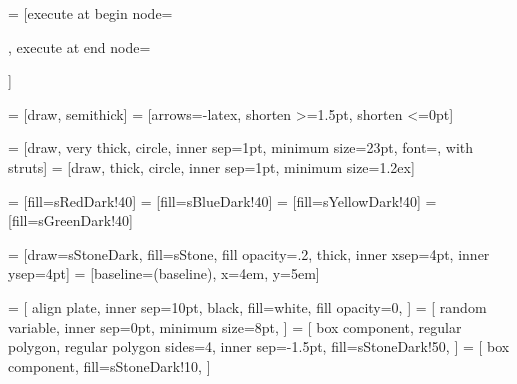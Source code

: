 \usepackage{tikz}
\usetikzlibrary{arrows.meta}
\usetikzlibrary{backgrounds}
\usetikzlibrary{fit}
\usetikzlibrary{scopes}
\usetikzlibrary{shapes.geometric}

 = [execute at begin node={\strut}, execute at end node={\strut}]

 = [draw, semithick]
 = [arrows={-latex}, shorten >=1.5pt, shorten <=0pt]

 = [draw, very thick, circle, inner sep=1pt, minimum size=23pt, font=\small, with struts]
 = [draw, thick, circle, inner sep=1pt, minimum size=1.2ex]

 = [fill=sRedDark!40]
 = [fill=sBlueDark!40]
 = [fill=sYellowDark!40]
 = [fill=sGreenDark!40]

 = [draw=sStoneDark, fill=sStone, fill opacity=.2, thick, inner xsep=4pt, inner ysep=4pt]
 = [baseline=(baseline), x=4em, y=5em]

 = [
    align plate,
    inner sep=10pt,
    black,
    fill=white,
    fill opacity=0,
]
 = [
    random variable,
    inner sep=0pt,
    minimum size=8pt,
]
 = [
    box component,
    regular polygon,
    regular polygon sides=4,
    inner sep=-1.5pt,
    fill=sStoneDark!50,
]
 = [
    box component,
    fill=sStoneDark!10,
]

\newcommand{\whiteboxblob}[1]{%
    \tikz[x=2.5em]{
        \node[inline random variable, #1] (x) {};
    }%
}
